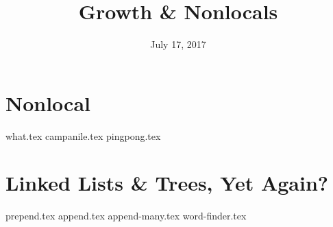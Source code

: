 \documentclass{exam}
\title{Growth \& Nonlocals}
\date{July 17, 2017}
\begin{document}
\maketitle

\section{Nonlocal}
\begin{questions}
{what.tex}
{campanile.tex}
{pingpong.tex}
\end{questions}

\clearpage

\section{Linked Lists \& Trees, Yet Again?}
\begin{questions}
{prepend.tex}
{append.tex}
{append-many.tex}
{word-finder.tex}
\end{questions}
\end{document}
